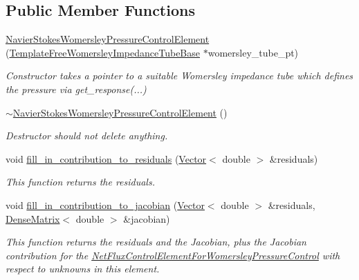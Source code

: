 \subsection*{Public Member Functions}
\begin{DoxyCompactItemize}
\item 
\hyperlink{classoomph_1_1NavierStokesWomersleyPressureControlElement_ad3293da10ac3a22cd70ae7c8c11980d9}{Navier\+Stokes\+Womersley\+Pressure\+Control\+Element} (\hyperlink{classoomph_1_1TemplateFreeWomersleyImpedanceTubeBase}{Template\+Free\+Womersley\+Impedance\+Tube\+Base} $\ast$womersley\+\_\+tube\+\_\+pt)
\begin{DoxyCompactList}\small\item\em Constructor takes a pointer to a suitable Womersley impedance tube which defines the pressure via get\+\_\+response(...) \end{DoxyCompactList}\item 
\hyperlink{classoomph_1_1NavierStokesWomersleyPressureControlElement_aaa4bdb2c63aea8177b120f39a309b645}{$\sim$\+Navier\+Stokes\+Womersley\+Pressure\+Control\+Element} ()
\begin{DoxyCompactList}\small\item\em Destructor should not delete anything. \end{DoxyCompactList}\item 
void \hyperlink{classoomph_1_1NavierStokesWomersleyPressureControlElement_a336e39637cd1405c5edefbcb4c9e26e8}{fill\+\_\+in\+\_\+contribution\+\_\+to\+\_\+residuals} (\hyperlink{classoomph_1_1Vector}{Vector}$<$ double $>$ \&residuals)
\begin{DoxyCompactList}\small\item\em This function returns the residuals. \end{DoxyCompactList}\item 
void \hyperlink{classoomph_1_1NavierStokesWomersleyPressureControlElement_aa899b746f1831673358ba6a71409e45c}{fill\+\_\+in\+\_\+contribution\+\_\+to\+\_\+jacobian} (\hyperlink{classoomph_1_1Vector}{Vector}$<$ double $>$ \&residuals, \hyperlink{classoomph_1_1DenseMatrix}{Dense\+Matrix}$<$ double $>$ \&jacobian)
\begin{DoxyCompactList}\small\item\em This function returns the residuals and the Jacobian, plus the Jacobian contribution for the \hyperlink{classoomph_1_1NetFluxControlElementForWomersleyPressureControl}{Net\+Flux\+Control\+Element\+For\+Womersley\+Pressure\+Control} with respect to unknowns in this element. \end{DoxyCompactList}\item 

\end{DoxyCompactItemize}
